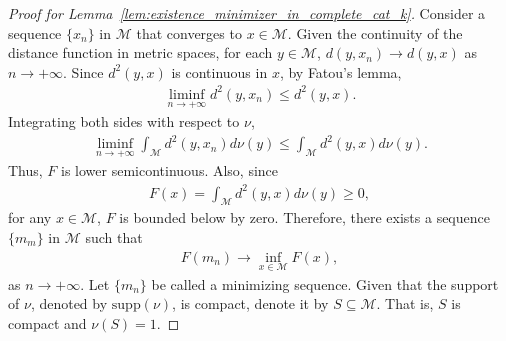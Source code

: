 \begin{proof}[Proof for Lemma~\ref{lem:existence_minimizer_in_complete_cat_k}]
    Consider a sequence $\{x_n\}$ in $\mathcal{M}$ that converges to $x \in \mathcal{M}$.
    Given the continuity of the distance function in metric spaces, for each $y \in \mathcal{M}$, $d(y, x_n) \to d(y, x)$ as $n \to +\infty$.
    Since $d^2(y, x)$ is continuous in $x$, by Fatou's lemma,
    \begin{align*}
        \liminf_{n \to +\infty} d^2(y, x_n) \leq d^2(y, x).
    \end{align*}
    Integrating both sides with respect to $\nu$,
    \begin{align*}
        \liminf_{n \to +\infty} \int_\mathcal{M} d^2(y, x_n) d\nu(y) \leq \int_\mathcal{M} d^2(y, x) d\nu(y).
    \end{align*}
    Thus, $F$ is lower semicontinuous.
    Also, since
    \begin{align*}
        F(x) = \int_\mathcal{M} d^2(y, x) d\nu(y) \geq 0,
    \end{align*}
    for any $x \in \mathcal{M}$, $F$ is bounded below by zero.
    Therefore, there exists a sequence $\{m_m\}$ in $\mathcal{M}$ such that
    \begin{align*}
        F(m_n) \to \inf_{x \in \mathcal{M}} F(x),
    \end{align*}
    as $n \to +\infty$.
    Let $\{m_n\}$ be called a minimizing sequence.
    Given that the support of $\nu$, denoted by $\mathrm{supp}(\nu)$, is compact, denote it by $S \subseteq \mathcal{M}$.
    That is, $S$ is compact and $\nu(S) = 1$.


\end{proof}
